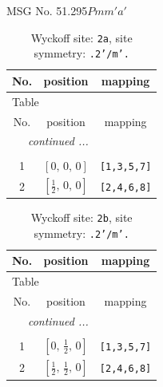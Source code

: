\documentclass[fleqn,8pt]{jsarticle}
\begin{document}
\setcounter{MaxMatrixCols}{32}

\renewcommand{\tablename}{Table~}
\renewcommand{\figurename}{Figure~}
\begin{center}
\LARGE
MSG No. 51.295\quad$Pmm'a'$
\end{center}
\renewcommand{\arraystretch}{1.2}
\begin{longtable}{ccc}
\caption{Wyckoff site: {\tt 2a}, site symmetry: {\tt .2'/m'.}}
 \\
 \hline \hline
No. & position & mapping \\ \hline \endfirsthead

\multicolumn{2}{l}{\tablename\ \thetable{}} \\
 \hline \hline
No. & position & mapping \\ \hline \endhead

 \hline \hline
\multicolumn{2}{r}{\footnotesize\it continued ...} \\ \endfoot

 \hline \hline
\multicolumn{2}{r}{} \\ \endlastfoot

1 & $\left[ 0,\, 0,\, 0 \right]$ & {\tt [1,3,5,7]} \\ \hline
2 & $\left[ \frac{1}{2},\, 0,\, 0 \right]$ & {\tt [2,4,6,8]} \\
\end{longtable}
\renewcommand{\arraystretch}{1.2}
\begin{longtable}{ccc}
\caption{Wyckoff site: {\tt 2b}, site symmetry: {\tt .2'/m'.}}
 \\
 \hline \hline
No. & position & mapping \\ \hline \endfirsthead

\multicolumn{2}{l}{\tablename\ \thetable{}} \\
 \hline \hline
No. & position & mapping \\ \hline \endhead

 \hline \hline
\multicolumn{2}{r}{\footnotesize\it continued ...} \\ \endfoot

 \hline \hline
\multicolumn{2}{r}{} \\ \endlastfoot

1 & $\left[ 0,\, \frac{1}{2},\, 0 \right]$ & {\tt [1,3,5,7]} \\ \hline
2 & $\left[ \frac{1}{2},\, \frac{1}{2},\, 0 \right]$ & {\tt [2,4,6,8]} \\
\end{longtable}
\renewcommand{\arraystretch}{1.2}
\end{document}
